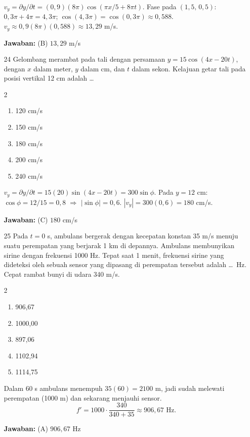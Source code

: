 \documentclass[11pt]{article}
\newenvironment{pilB}{%
  \par\smallskip\begin{multicols}{2}
  \begin{enumerate}[label=(\Alph*),leftmargin=*,itemsep=1pt,topsep=3pt]}%
  {\end{enumerate}\end{multicols}}
\newcommand{\jawaban}[1]{%
  \noindent\colorbox{gold!30}{\parbox{\dimexpr\linewidth-2\fboxsep\relax}{%
    \textbf{Jawaban:} #1}}\par\smallskip}
\begin{document}
\begin{pembox}
$v_y=\partial y/\partial t=(0{,}9)(8\pi)\cos(\pi x/5+8\pi t)$. Fase pada $(1{,}5,\,0{,}5)$: $0{,}3\pi+4\pi=4{,}3\pi$; $\cos(4{,}3\pi)=\cos(0{,}3\pi)\approx0{,}588$. $v_y\approx0{,}9(8\pi)(0{,}588)\approx13{,}29$ m/s.
\jawaban{(B) $13{,}29$ m/s}
\end{pembox}

\begin{soal}{24}
Gelombang merambat pada tali dengan persamaan $y=15\cos(4x-20t)$,
dengan $x$ dalam meter, $y$ dalam cm, dan $t$ dalam sekon. Kelajuan
getar tali pada posisi vertikal 12 cm adalah \ldots
\begin{pilB}
  \item 120 cm/s \item 150 cm/s \item 180 cm/s \item 200 cm/s \item 240 cm/s
\end{pilB}
\end{soal}

\begin{pembox}
$v_y=\partial y/\partial t=15(20)\sin(4x-20t)=300\sin\phi$. Pada $y=12$ cm: $\cos\phi=12/15=0{,}8$ $\Rightarrow$ $|\sin\phi|=0{,}6$. $|v_y|=300(0{,}6)=180$ cm/s.
\jawaban{(C) $180$ cm/s}
\end{pembox}

\begin{soal}{25}
Pada $t=0$ s, ambulans bergerak dengan kecepatan konstan 35 m/s menuju
suatu perempatan yang berjarak 1 km di depannya. Ambulans membunyikan
sirine dengan frekuensi 1000 Hz. Tepat saat 1 menit, frekuensi sirine
yang dideteksi oleh sebuah sensor yang dipasang di perempatan tersebut
adalah \ldots\ Hz. Cepat rambat bunyi di udara 340 m/s.
\begin{pilB}
  \item 906,67 \item 1000,00 \item 897,06 \item 1102,94 \item 1114,75
\end{pilB}
\end{soal}

\begin{pembox}
Dalam 60 s ambulans menempuh $35(60)=2100$ m, jadi sudah melewati perempatan (1000 m) dan sekarang menjauhi sensor.
\[f'=1000\cdot\frac{340}{340+35}\approx906{,}67\text{ Hz.}\]
\jawaban{(A) $906{,}67$ Hz}
\end{pembox}
\end{document}
